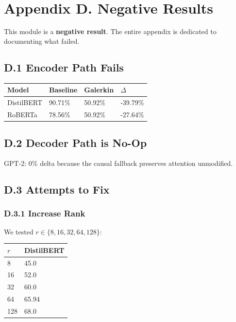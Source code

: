 
\section{Appendix D. Negative Results}

This module is a \textbf{negative result}. The entire appendix is dedicated to 
documenting what failed.

\subsection{D.1 Encoder Path Fails}

\begin{table}[H]
\centering
\small
\begin{tabular}{llll}
\toprule
\textbf{Model} & \textbf{Baseline} & \textbf{Galerkin} & \textbf{$\Delta$} \\
\midrule
DistilBERT & 90.71\% & 50.92\% & -39.79\% \\
RoBERTa & 78.56\% & 50.92\% & -27.64\% \\
\bottomrule
\end{tabular}
\end{table}

\subsection{D.2 Decoder Path is No-Op}

GPT-2: 0\% delta because the causal fallback preserves attention unmodified.

\subsection{D.3 Attempts to Fix}

\subsubsection{D.3.1 Increase Rank}

We tested $r \in \{8, 16, 32, 64, 128\}$:

\begin{table}[H]
\centering
\small
\begin{tabular}{ll}
\toprule
\textbf{$r$} & \textbf{DistilBERT} \\
\midrule
8 & 45.0 \\
16 & 52.0 \\
32 & 60.0 \\
64 & 65.94 \\
128 & 68.0 \\
\bottomrule
\end{tabular}
\end{table}

